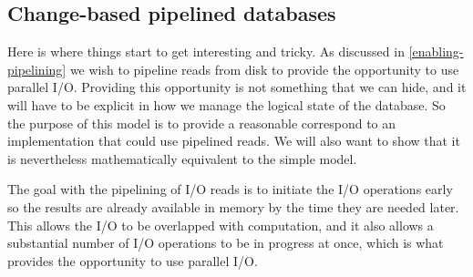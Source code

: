 \documentclass[11pt,a4paper]{article}
\begin{document}
\subsection{Change-based pipelined databases}

Here is where things start to get interesting and tricky. As discussed in
\cref{enabling-pipelining} we wish to pipeline reads from disk to provide the
opportunity to use parallel I/O. Providing this opportunity is not something
that we can hide, and it will have to be explicit in how we manage the logical
state of the database. So the purpose of this model is to provide a reasonable
correspond to an implementation that could use pipelined reads. We will also
want to show that it is nevertheless mathematically equivalent to the simple
model.

The goal with the pipelining of I/O reads is to initiate the I/O operations
early so the results are already available in memory by the time they are
needed later. This allows the I/O to be overlapped with computation, and it
also allows a substantial number of I/O operations to be in progress at once,
which is what provides the opportunity to use parallel I/O.
\end{document}
